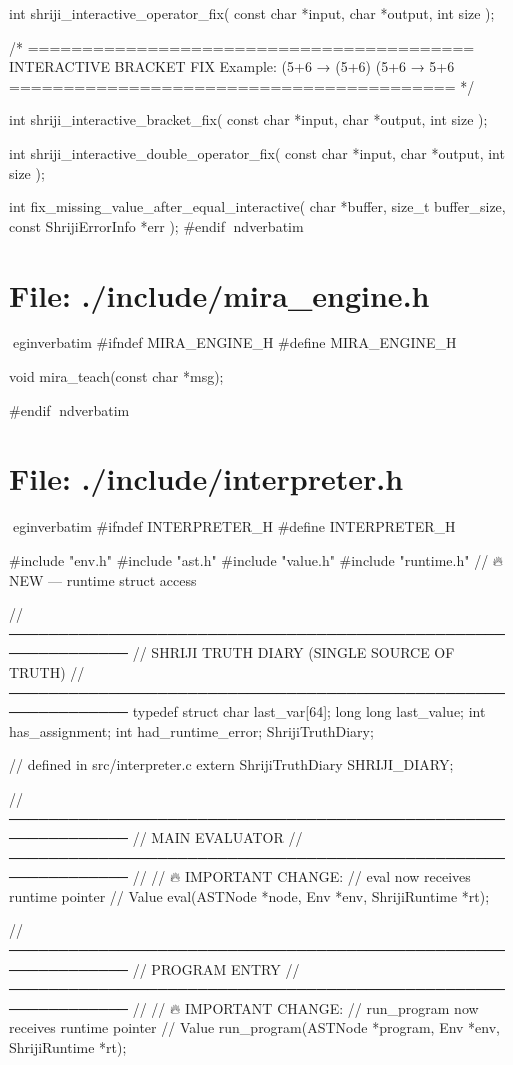 \documentclass{article}
\begin{document}
int shriji_interactive_operator_fix(
    const char *input,
    char *output,
    int size
);


/* =========================================
   INTERACTIVE BRACKET FIX
   Example: (5+6 → (5+6)
            (5+6 → 5+6
   ========================================= */

int shriji_interactive_bracket_fix(
    const char *input,
    char *output,
    int size
);

int shriji_interactive_double_operator_fix(
    const char *input,
    char *output,
    int size
);

int fix_missing_value_after_equal_interactive(
    char *buffer,
    size_t buffer_size,
    const ShrijiErrorInfo *err
);
#endif
nd{verbatim}
\section*{File: ./include/mira_engine.h}
egin{verbatim}
#ifndef MIRA_ENGINE_H
#define MIRA_ENGINE_H

void mira_teach(const char *msg);

#endif
nd{verbatim}
\section*{File: ./include/interpreter.h}
egin{verbatim}
#ifndef INTERPRETER_H
#define INTERPRETER_H

#include "env.h"
#include "ast.h"
#include "value.h"
#include "runtime.h"   // 🔥 NEW — runtime struct access

//──────────────────────────────────────────────────────────────
// SHRIJI TRUTH DIARY (SINGLE SOURCE OF TRUTH)
//──────────────────────────────────────────────────────────────
typedef struct {
    char last_var[64];
    long long last_value;
    int has_assignment;
    int had_runtime_error;
} ShrijiTruthDiary;

// defined in src/interpreter.c
extern ShrijiTruthDiary SHRIJI_DIARY;


//──────────────────────────────────────────────────────────────
// MAIN EVALUATOR
//──────────────────────────────────────────────────────────────
//
// 🔥 IMPORTANT CHANGE:
// eval now receives runtime pointer
//
Value eval(ASTNode *node, Env *env, ShrijiRuntime *rt);


//──────────────────────────────────────────────────────────────
// PROGRAM ENTRY
//──────────────────────────────────────────────────────────────
//
// 🔥 IMPORTANT CHANGE:
// run_program now receives runtime pointer
//
Value run_program(ASTNode *program, Env *env, ShrijiRuntime *rt);
\end{document}

